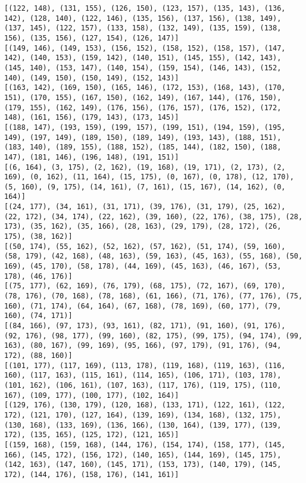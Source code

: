 \documentclass[11pt]{article}
\begin{document}
\begin{Verbatim}[commandchars=\\\{\}]
[(122, 148), (131, 155), (126, 150), (123, 157), (135, 143), (136, 142), (128, 140), (122, 146), (135, 156), (137, 156), (138, 149), (137, 145), (122, 157), (133, 158), (132, 149), (135, 159), (138, 156), (135, 156), (127, 154), (126, 147)]
[(149, 146), (149, 153), (156, 152), (158, 152), (158, 157), (147, 142), (140, 153), (159, 142), (140, 151), (145, 155), (142, 143), (145, 140), (153, 147), (140, 154), (159, 154), (146, 143), (152, 140), (149, 150), (150, 149), (152, 143)]
[(163, 142), (169, 150), (165, 146), (172, 153), (168, 143), (170, 151), (170, 155), (167, 150), (162, 149), (167, 144), (176, 150), (179, 155), (162, 149), (176, 156), (176, 157), (176, 152), (172, 148), (161, 156), (179, 143), (173, 145)]
[(188, 147), (193, 159), (199, 157), (199, 151), (194, 159), (195, 149), (197, 149), (189, 150), (189, 149), (193, 143), (188, 151), (183, 140), (189, 155), (188, 152), (185, 144), (182, 150), (188, 147), (181, 146), (196, 148), (191, 151)]
[(6, 164), (3, 175), (2, 162), (19, 168), (19, 171), (2, 173), (2, 169), (0, 162), (11, 164), (15, 175), (0, 167), (0, 178), (12, 170), (5, 160), (9, 175), (14, 161), (7, 161), (15, 167), (14, 162), (0, 164)]
[(24, 177), (34, 161), (31, 171), (39, 176), (31, 179), (25, 162), (22, 172), (34, 174), (22, 162), (39, 160), (22, 176), (38, 175), (28, 173), (35, 162), (35, 166), (28, 163), (29, 179), (28, 172), (26, 175), (38, 162)]
[(50, 174), (55, 162), (52, 162), (57, 162), (51, 174), (59, 160), (58, 179), (42, 168), (48, 163), (59, 163), (45, 163), (55, 168), (50, 169), (45, 170), (58, 178), (44, 169), (45, 163), (46, 167), (53, 178), (46, 176)]
[(75, 177), (62, 169), (76, 179), (68, 175), (72, 167), (69, 170), (78, 176), (70, 168), (78, 168), (61, 166), (71, 176), (77, 176), (75, 160), (71, 174), (64, 164), (67, 168), (78, 169), (60, 177), (79, 160), (74, 171)]
[(84, 166), (97, 173), (93, 161), (82, 171), (91, 160), (91, 176), (92, 176), (98, 177), (99, 160), (82, 175), (99, 175), (94, 174), (99, 163), (80, 167), (99, 169), (95, 166), (97, 179), (91, 176), (94, 172), (88, 160)]
[(101, 177), (117, 169), (113, 178), (119, 168), (119, 163), (116, 160), (117, 163), (115, 161), (114, 165), (106, 171), (103, 178), (101, 162), (106, 161), (107, 163), (117, 176), (119, 175), (110, 167), (109, 177), (100, 177), (102, 164)]
[(129, 176), (130, 179), (120, 168), (133, 171), (122, 161), (122, 172), (121, 170), (127, 164), (139, 169), (134, 168), (132, 175), (130, 168), (133, 169), (136, 166), (130, 164), (139, 177), (139, 172), (135, 165), (125, 172), (121, 165)]
[(159, 168), (159, 168), (144, 176), (154, 174), (158, 177), (145, 166), (145, 172), (156, 172), (140, 165), (144, 169), (145, 175), (142, 163), (147, 160), (145, 171), (153, 173), (140, 179), (145, 172), (144, 176), (158, 176), (141, 161)]

\end{Verbatim}
\end{document}
